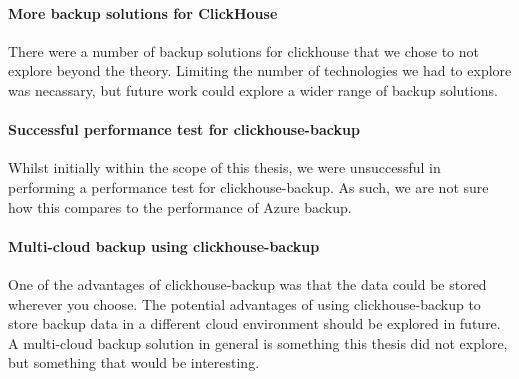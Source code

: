 \paragraph{More backup solutions for ClickHouse}
There were a number of backup solutions for clickhouse that we chose to not explore beyond the theory. Limiting the number of technologies we had to explore was necassary, but future work could explore a wider range of backup solutions. 

\paragraph{Successful performance test for clickhouse-backup}
Whilst initially within the scope of this thesis, we were unsuccessful in performing a performance test for clickhouse-backup. As such, we are not sure how this compares to the performance of Azure backup. 

\paragraph{Multi-cloud backup using clickhouse-backup}
One of the advantages of clickhouse-backup was that the data could be stored wherever you choose. The potential advantages of using clickhouse-backup to store backup data in a different cloud environment should be explored in future. A multi-cloud backup solution in general is something this thesis did not explore, but something that would be interesting. 




